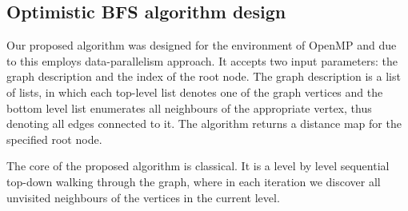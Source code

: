 \documentclass[letterpaper]{article}
\begin{document}
		
		
		
				
			
		\subsection{Optimistic BFS algorithm design}
			Our proposed algorithm was designed for the environment of OpenMP and due to this employs data-parallelism approach. 
			It accepts two input parameters: the graph description and the index of the root node.
			The graph description is a list of lists, in which each top-level list denotes one of the graph vertices and the bottom level list enumerates all neighbours of the appropriate vertex, thus denoting all edges connected to it.
			The algorithm returns a distance map for the specified root node.
			
			The core of the proposed algorithm is classical. 
			It is a level by level sequential top-down walking through the graph, where in each iteration we discover all unvisited neighbours of the vertices in the current level.
			
\end{document}
